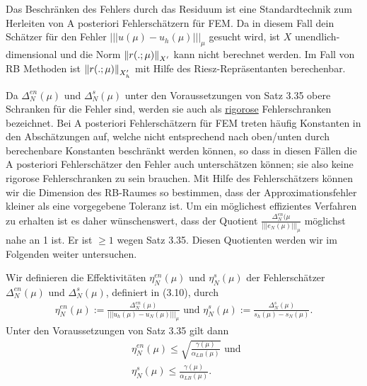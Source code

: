 Das Beschränken des Fehlers durch das Residuum ist eine Standardtechnik zum Herleiten von A posteriori Fehlerschätzern für FEM.
Da in diesem Fall dein Schätzer für den Fehler $|||u(\mu)-u_h(\mu)|||_\mu$ gesucht wird, ist $X$ unendlich-dimensional und die Norm $\left\Vert r(.;\mu)\right\Vert_{X'}$ kann nicht berechnet werden.
Im Fall von RB Methoden ist $\left\Vert r(.;\mu)\right\Vert_{X_h'}$ mit Hilfe des Riesz-Repräsentanten berechenbar.

Da $\Delta_N^{en}(\mu)$ und $\Delta_N^s(\mu)$ unter den Voraussetzungen von Satz 3.35 obere Schranken für die Fehler sind, werden sie auch als \uline{rigorose} Fehlerschranken bezeichnet.
Bei A posteriori Fehlerschätzern für FEM treten häufig Konstanten in den Abschätzungen auf, welche nicht entsprechend nach oben/unten durch berechenbare Konstanten beschränkt werden können, so dass in diesen Fällen die A posteriori Fehlerschätzer den Fehler auch unterschätzen können;
sie also keine rigorose Fehlerschranken zu sein brauchen.
Mit Hilfe des Fehlerschätzers können wir die Dimension des RB-Raumes so bestimmen, dass der Approximationsfehler kleiner als eine vorgegebene Toleranz ist.
Um ein möglichest effizientes Verfahren zu erhalten ist es daher wünschenswert, dass der Quotient $\frac{\Delta_N^{en}(\mu}{|||e_N(\mu)|||_\mu}$ möglichst nahe an 1 ist.
Er ist $\ge 1$ wegen Satz 3.35.
Diesen Quotienten werden wir im Folgenden weiter untersuchen.

Wir definieren die Effektivitäten $\eta_N^{en}(\mu)$ und $\eta_N^s(\mu)$ der Fehlerschätzer $\Delta_N^{en}(\mu)$ und $\Delta_N^s(\mu)$, definiert in (3.10), durch
\begin{align}
\eta_N^{en}(\mu) := \frac{\Delta_N^{en}(\mu)}{|||u_h(\mu)-u_N(\mu)|||_\mu} \text{ und } \eta_N^s(\mu) :=\frac{\Delta_N^s(\mu)}{s_h(\mu)-s_N(\mu)}.
\end{align}
Unter den Voraussetzungen von Satz 3.35 gilt dann
\begin{align}
&\eta_N^{en}(\mu) \le \sqrt{\frac{\gamma(\mu)}{\alpha_{LB}(\mu)}} \text{ und }\\
&\eta_N^s(\mu)\le \frac{\gamma(\mu)}{\alpha_{LB}(\mu)}.
\end{align}

